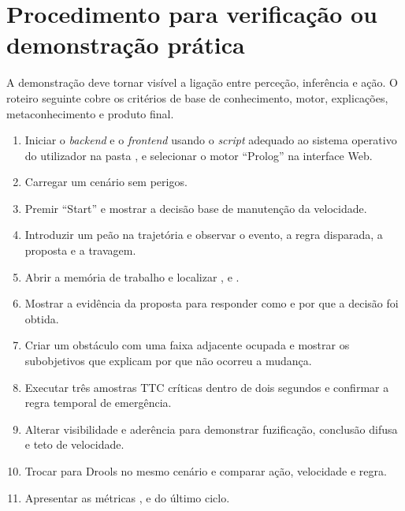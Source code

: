 \chapter{Procedimento para verificação ou demonstração prática}
\label{cap:demonstracao}

A demonstração deve tornar visível a ligação entre perceção, inferência e ação.
O roteiro seguinte cobre os critérios de base de conhecimento, motor,
explicações, metaconhecimento e produto final.

\begin{enumerate}
  \item Iniciar o \emph{backend} e o \emph{frontend} usando o \emph{script}
    adequado ao sistema operativo do utilizador na pasta , e
    selecionar o motor \enquote{Prolog} na interface Web.
  \item Carregar um cenário sem perigos.
  \item Premir \enquote{Start} e mostrar a decisão base de manutenção da
    velocidade.
  \item Introduzir um peão na trajetória e observar o evento, a regra disparada,
    a proposta e a travagem.
  \item Abrir a memória de trabalho e localizar ,
     e .
  \item Mostrar a evidência da proposta para responder como e por que a decisão
    foi obtida.
  \item Criar um obstáculo com uma faixa adjacente ocupada e mostrar os
    subobjetivos que explicam por que não ocorreu a mudança.
  \item Executar três amostras TTC críticas dentro de dois segundos e confirmar a
    regra temporal de emergência.
  \item Alterar visibilidade e aderência para demonstrar fuzificação, conclusão
    difusa e teto de velocidade.
  \item Trocar para Drools no mesmo cenário e comparar ação, velocidade e regra.
  \item Apresentar as métricas ,  e 
    do último ciclo.
\end{enumerate}
